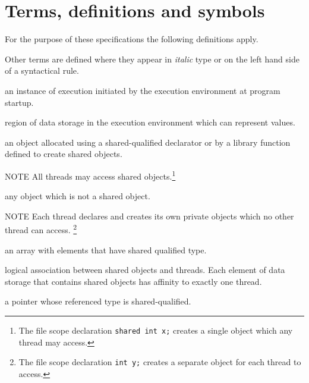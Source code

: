

\section{Terms, definitions and symbols}

\npf For the purpose of these specifications the following
    definitions apply.

\np Other terms are defined where they appear in {\em
    italic} type or on the left hand side of a syntactical rule.

% 
     an instance of execution initiated by the execution
     environment at program startup.

%
     region of data storage in the execution environment
     which can represent values.

%
    an object allocated using a shared-qualified
    declarator or by a library function defined to create shared objects.
    
\np  NOTE \hspace{5pt}  All threads may access shared 
     objects.\footnote{The file scope declaration
     {\tt shared int x;} creates a single object which any thread may access.}
   
%
     any object which is not a shared object.

\np  NOTE \hspace{5pt} Each thread declares and creates its own 
     private objects which no other thread can access.
     \footnote{The file scope declaration
     {\tt int y;} creates a separate object for each thread to access.}

%
     an array with elements that have shared qualified type.
  
%
     logical association between shared
     objects and threads.  Each element of data storage that contains
     shared objects has affinity to exactly one thread.
 
%
     a pointer whose referenced type is shared-qualified.

